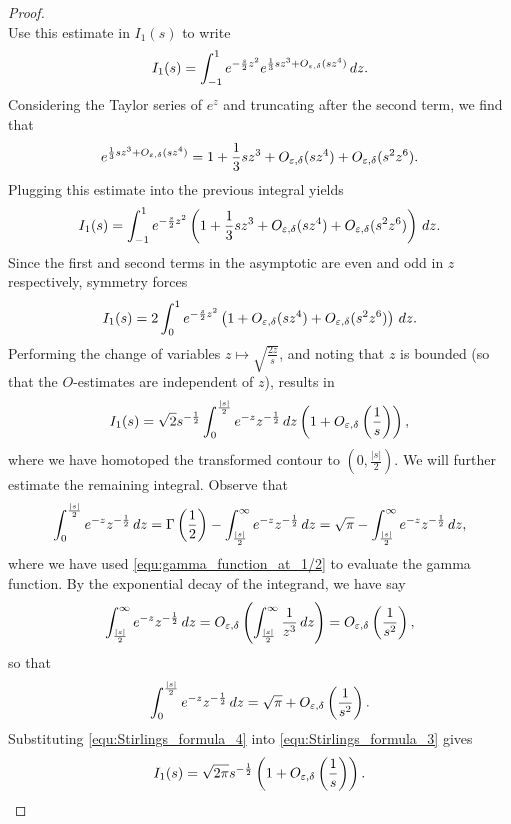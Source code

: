 \begin{proof}
\[      \]
      Use this estimate in \(I_{1}(s)\) to write
      \[
        I_{1}(s) = \int_{-1}^{1}e^{-\frac{s}{2}z^{2}}e^{\frac{1}{3}sz^{3}+O_{\varepsilon,\delta}(sz^{4})}\,dz.
      \]
        Considering the Taylor series of \(e^{z}\) and truncating after the second term, we find that
      \[
        e^{\frac{1}{3}sz^{3}+O_{\varepsilon,\delta}(sz^{4})} = 1+\frac{1}{3}sz^{3}+O_{\varepsilon,\delta}(sz^{4})+O_{\varepsilon,\delta}(s^{2}z^{6}).
      \]
      Plugging this estimate into the previous integral yields
      \[
        I_{1}(s) = \int_{-1}^{1}e^{-\frac{s}{2}z^{2}}\left(1+\frac{1}{3}sz^{3}+O_{\varepsilon,\delta}(sz^{4})+O_{\varepsilon,\delta}(s^{2}z^{6})\right)\,dz.
      \]
      Since the first and second terms in the asymptotic are even and odd in \(z\) respectively, symmetry forces
      \[
        I_{1}(s) = 2\int_{0}^{1}e^{-\frac{s}{2}z^{2}}\left(1+O_{\varepsilon,\delta}(sz^{4})+O_{\varepsilon,\delta}(s^{2}z^{6})\right)\,dz.
      \]
      Performing the change of variables \(z \mapsto \sqrt{\frac{2z}{s}}\), and noting that \(z\) is bounded (so that the \(O\)-estimates are independent of \(z\)), results in
      \begin{equation}\label{equ:Stirlings_formula_3}
        I_{1}(s) = \sqrt{2}s^{-\frac{1}{2}}\int_{0}^{\frac{|s|}{2}}e^{-z}z^{-\frac{1}{2}}\,dz\left(1+O_{\varepsilon,\delta}\left(\frac{1}{s}\right)\right),
      \end{equation}
      where we have homotoped the transformed contour to \(\left(0,\frac{|s|}{2}\right)\). We will further estimate the remaining integral. Observe that
      \[
        \int_{0}^{\frac{|s|}{2}}e^{-z}z^{-\frac{1}{2}}\,dz = \Gamma\left(\frac{1}{2}\right)-\int_{\frac{|s|}{2}}^{\infty}e^{-z}z^{-\frac{1}{2}}\,dz = \sqrt{\pi}-\int_{\frac{|s|}{2}}^{\infty}e^{-z}z^{-\frac{1}{2}}\,dz,
      \]
      where we have used \cref{equ:gamma_function_at_1/2} to evaluate the gamma function. By the exponential decay of the integrand, we have say
      \[
        \int_{\frac{|s|}{2}}^{\infty}e^{-z}z^{-\frac{1}{2}}\,dz = O_{\varepsilon,\delta}\left(\int_{\frac{|s|}{2}}^{\infty}\frac{1}{z^{3}}\,dz\right) = O_{\varepsilon,\delta}\left(\frac{1}{s^{2}}\right),
      \]
      so that 
      \begin{equation}\label{equ:Stirlings_formula_4}
        \int_{0}^{\frac{|s|}{2}}e^{-z}z^{-\frac{1}{2}}\,dz = \sqrt{\pi}+O_{\varepsilon,\delta}\left(\frac{1}{s^{2}}\right).
      \end{equation}
      Substituting \cref{equ:Stirlings_formula_4} into \cref{equ:Stirlings_formula_3} gives
      \begin{equation}\label{equ:Stirlings_formula_5}
        I_{1}(s) = \sqrt{2\pi}s^{-\frac{1}{2}}\left(1+O_{\e,\d}\left(\frac{1}{s}\right)\right).

\end{equation}
\end{proof}
